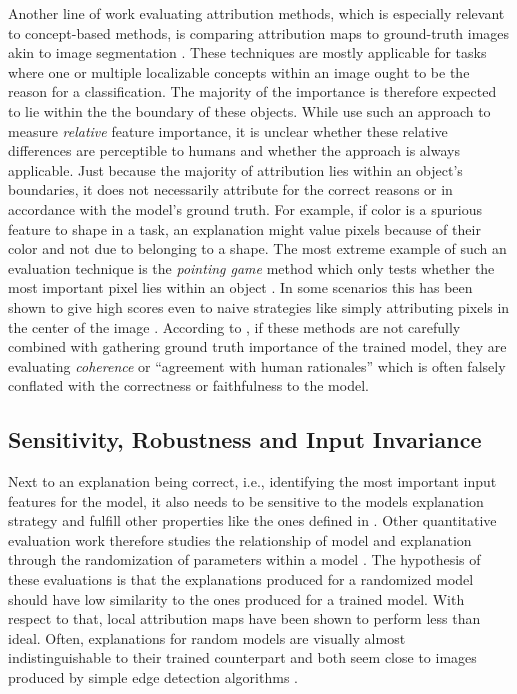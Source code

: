 Another line of work evaluating attribution methods, which is especially relevant to concept-based methods, is comparing attribution maps to ground-truth images akin to image segmentation \citep{Kim2018,Yang2019,Bau2020,Arras2022,Clark2023}. These techniques are mostly applicable for tasks where one or multiple localizable concepts within an image ought to be the reason for a classification. The majority of the importance is therefore expected to lie within the the boundary of these objects. While \cite{Yang2019} use such an approach to measure \textit{relative} feature importance, it is unclear whether these relative differences are perceptible to humans and whether the approach is always applicable. Just because the majority of attribution lies within an object's boundaries, it does not necessarily attribute for the correct reasons or in accordance with the model's ground truth. For example, if color is a spurious feature to shape in a task, an explanation might value pixels because of their color and not due to belonging to a shape. The most extreme example of such an evaluation technique is the \textit{pointing game} method which only tests whether the most important pixel lies within an object \citep{Zhang2016}. In some scenarios this has been shown to give high scores even to naive strategies like simply attributing pixels in the center of the image \citep{Gu2019}. According to \cite{Nauta2023}, if these methods are not carefully combined with gathering ground truth importance of the trained model, they are evaluating \textit{coherence} or ``agreement with human rationales'' which is often falsely conflated with the correctness or faithfulness to the model. 

\subsection{Sensitivity, Robustness and Input Invariance}
Next to an explanation being correct, i.e., identifying the most important input features for the model, it also needs to be sensitive to the models explanation strategy and fulfill other properties like the ones defined in \cite{Nauta2023}.
Other quantitative evaluation work therefore studies the relationship of model and explanation through the randomization of parameters within a model \citep{Adebayo2018, Sixt2020}. The hypothesis of these evaluations is that the explanations produced for a randomized model should have low similarity to the ones produced for a trained model. With respect to that, local attribution maps have been shown to perform less than ideal. Often, explanations for random models are visually almost indistinguishable to their trained counterpart and both seem close to images produced by simple edge detection algorithms \citep{Adebayo2018, Clark2023}.

